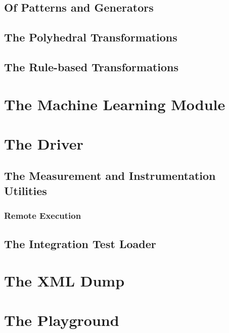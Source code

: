 \subsection{Of Patterns and Generators}
\label{sec:Compiler.Transform.Pattern}
\subsection{The Polyhedral Transformations}
\subsection{The Rule-based Transformations}

\section{The Machine Learning Module}

\section{The Driver}
\subsection{The Measurement and Instrumentation Utilities}
\subsubsection{Remote Execution}
\subsection{The Integration Test Loader}

\section{The XML Dump}
\section{The Playground}
